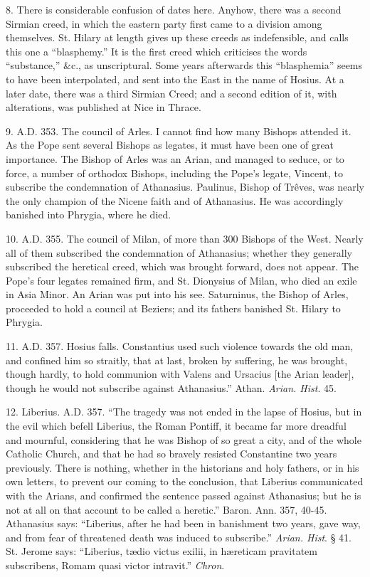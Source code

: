 8. There is considerable confusion of dates here.
Anyhow, there was a second Sirmian creed, in which the eastern
party first came to a division among themselves. St. Hilary at length
gives up these creeds as indefensible, and calls this one a ``blasphemy.''
It is the first creed which criticises the words ``substance,'' \&c.,
as unscriptural. Some years afterwards this ``blasphemia'' seems to have
been interpolated, and sent into the East in the name of Hosius. At a
later date, there was a third Sirmian Creed; and a second edition of it,
with alterations, was published at Nice in Thrace.

9. A.D.
353. The council of Arles. I cannot find how many Bishops attended it.
As the Pope sent several Bishops as legates, it must have been one of
great importance. The Bishop of Arles was an Arian, and managed to
seduce, or to force, a number of orthodox Bishops, including the Pope's
legate, Vincent, to subscribe the condemnation of Athanasius. Paulinus,
Bishop of Trêves, was nearly the only champion of the Nicene faith and
of Athanasius. He was accordingly banished into Phrygia, where he died.

10. A.D.
355. The council of Milan, of more than 300 Bishops of the West. Nearly
all of them subscribed the condemnation of Athanasius; whether they
generally subscribed the heretical creed, which was brought forward,
does not appear. The Pope's four legates remained firm, and St.
Dionysius of Milan, who died an exile in Asia Minor. An Arian was put
into his see. Saturninus, the Bishop of Arles, proceeded to hold a
council at Beziers; and its fathers banished St. Hilary to Phrygia.

11. A.D.
357. Hosius falls. Constantius used such violence towards the old man,
and confined him so straitly, that at last, broken by suffering, he was
brought, though hardly, to hold communion with Valens and Ursacius [the
Arian leader], though he would not subscribe against Athanasius.'' Athan.
\emph{Arian. Hist}. 45.

12. Liberius. A.D. 357. ``The tragedy was not ended in the lapse of Hosius, but
in the evil which befell Liberius, the Roman Pontiff, it became far more
dreadful and mournful, considering that he was Bishop of so great a
city, and of the whole Catholic Church, and that he had so bravely
resisted Constantine two years previously. There is nothing, whether in
the historians and holy fathers, or in his own letters, to prevent our
coming to the conclusion, that Liberius communicated with the Arians,
and confirmed the sentence passed against Athanasius; but he is not at
all on that account to be called a heretic.'' Baron. Ann. 357, 40-45.
Athanasius says: ``Liberius, after he had been in banishment two years,
gave way, and from fear of threatened death was induced to subscribe.'' \emph{Arian.
Hist}. § 41. St. Jerome says: ``Liberius, tædio victus exilii, in hæreticam
pravitatem subscribens, Romam quasi victor intravit.'' \emph{Chron}.

